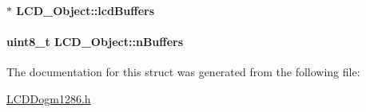 \paragraph[{lcd\+Buffers}]{$\ast$ L\+C\+D\+\_\+\+Object\+::lcd\+Buffers}\label{struct_l_c_d___object_acf7322679a62a6a8f0d0c26363d33696}
\paragraph[{n\+Buffers}]{\setlength{\rightskip}{0pt plus 5cm}uint8\+\_\+t L\+C\+D\+\_\+\+Object\+::n\+Buffers}\label{struct_l_c_d___object_aaedc411a324d3ada993422793871a919}


The documentation for this struct was generated from the following file\+:\begin{DoxyCompactItemize}
\item 
\hyperlink{_l_c_d_dogm1286_8h}{L\+C\+D\+Dogm1286.\+h}\end{DoxyCompactItemize}
